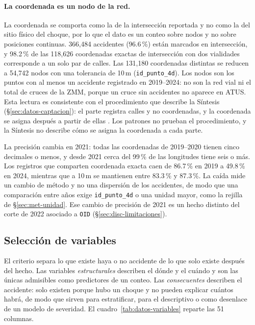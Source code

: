 \paragraph{La coordenada es un nodo de la red.} La coordenada se comporta como la
de la intersección reportada y no como la del sitio físico del choque, por lo que
el dato es un conteo sobre nodos y no sobre posiciones continuas.
366,484 accidentes (96.6\,\%) están marcados en intersección, y 98.2\,\% de las
118,626 coordenadas exactas de intersección con dos vialidades corresponde a un
solo par de calles. Las 131,180 coordenadas distintas se reducen a 54,742 nodos
con una tolerancia de 10\,m (\texttt{id\_punto\_4d}). Los nodos son los puntos con
al menos un accidente registrado en 2019--2024: no son la red vial ni el total de
cruces de la ZMM, porque un cruce sin accidentes no aparece en ATUS. Esta
lectura es consistente con el procedimiento que describe la Síntesis
(§\ref{sec:datos-captacion}): el parte registra calles y no coordenadas, y la
coordenada se asigna después a partir de ellas \parencite{inegi_sintesis2016}. Los
patrones no prueban el procedimiento, y la Síntesis no describe cómo se asigna la
coordenada a cada parte.

La precisión cambia en 2021: todas las coordenadas de 2019--2020 tienen cinco
decimales o menos, y desde 2021 cerca del 99\,\% de las longitudes tiene seis o
más. Los registros
que comparten coordenada exacta caen de 86.7\,\% en 2019 a 49.8\,\% en 2024,
mientras que a 10\,m se mantienen entre 83.3\,\% y 87.3\,\%. La caída mide un
cambio de método y no una dispersión de los accidentes, de modo que una comparación
entre años exige \texttt{id\_punto\_4d} o una unidad mayor, como la rejilla de
§\ref{sec:met-unidad}. Ese cambio de precisión de 2021 es un hecho distinto del
corte de 2022 asociado a \texttt{OID} (§\ref{sec:disc-limitaciones}).

\subsection{Selección de variables}\label{sec:datos-variables}

El criterio separa lo que existe haya o no accidente de lo que solo existe después
del hecho. Las variables \emph{estructurales} describen el dónde y el cuándo y son
las únicas admisibles como predictores de un conteo. Las \emph{consecuentes}
describen el accidente: solo existen porque hubo un choque y no pueden explicar
cuántos habrá, de modo que sirven para estratificar, para el descriptivo o como
desenlace de un modelo de severidad. El cuadro~\ref{tab:datos-variables} reparte
las 51 columnas.

